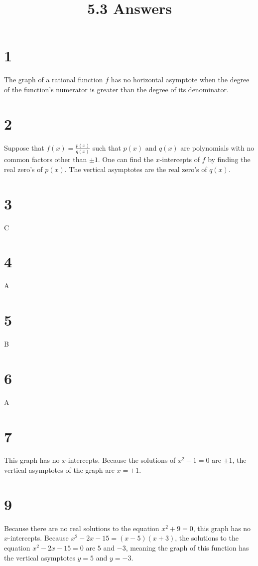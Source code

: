 \documentclass{article}
\title{5.3 Answers}
\theoremstyle{definition}
\newcommand{\?}{\stackrel{?}{=}}
\begin{document}
\maketitle

\section*{1}
The graph of a rational function $f$ has no horizontal asymptote when the degree of the function's numerator is greater than the degree of its 
denominator.

\section*{2}
Suppose that $f(x)=\frac{p(x)}{q(x)}$ such that $p(x)$ and $q(x)$ are polynomials with no common factors other than $\pm 1$.
One can find the $x$-intercepts of $f$ by finding the real zero's of $p(x)$. The vertical asymptotes are the real zero's of 
$q(x)$.

\section*{3}
C

\section*{4}
A

\section*{5}
B

\section*{6}
A

\section*{7}
This graph has no $x$-intercepts. Because the solutions of $x^2-1=0$ are $\pm 1$, the vertical asymptotes of the graph are $x=\pm 1$.

\section*{9}
Because there are no real solutions to the equation $x^2+9=0$, this graph has no $x$-intercepts. 
Because $x^2-2x-15=(x-5)(x+3)$, the solutions to the equation $x^2-2x-15=0$ are $5$ and $-3$, meaning the graph of this function has the vertical asymptotes 
$y=5$ and $y=-3$.
\end{document}
